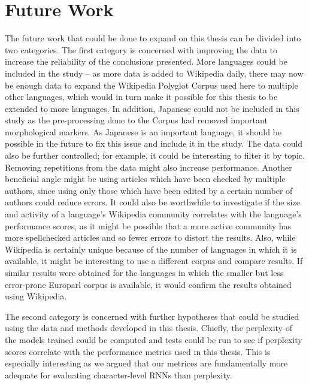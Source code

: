 \documentclass[11pt,a4paper,twoside,openright]{scrbook}
\begin{document}
\section{Future Work}
The future work that could be done to expand on this thesis can be divided into two categories. The first category is concerned with improving the data to increase the reliability of the conclusions presented. More languages could be included in the study – as more data is added to Wikipedia daily, there may now be enough data to expand the Wikipedia Polyglot Corpus used here to multiple other languages, which would in turn make it possible for this thesis to be extended to more languages. In addition, Japanese could not be included in this study as the pre-processing done to the Corpus had removed important morphological markers. As Japanese is an important language, it should be possible in the future to fix this issue and include it in the study. The data could also be further controlled; for example, it could be interesting to filter it by topic. Removing repetitions from the data might also increase performance. Another beneficial angle might be using articles which have been checked by multiple authors, since using only those which have been edited by a certain number of authors could reduce errors.
It could also be worthwhile to investigate if the size and activity of a language’s Wikipedia community correlates with the language’s performance scores, as it might be possible that a more active community has more spellchecked articles and so fewer errors to distort the results. Also, while Wikipedia is certainly unique because of the number of languages in which it is available, it might be interesting to use a different corpus and compare results. If similar results were obtained for the languages in which the smaller but less error-prone Europarl corpus is available, it would confirm the results obtained using Wikipedia.

The second category is concerned with further hypotheses that could be studied using the data and methods developed in this thesis. Chiefly, the perplexity of the models trained could be computed and tests could be run to see if perplexity scores correlate with the performance metrics used in this thesis. This is especially interesting as we argued that our metrices are fundamentally more adequate for evaluating character-level RNNs than perplexity.




\newpage
\end{document}
